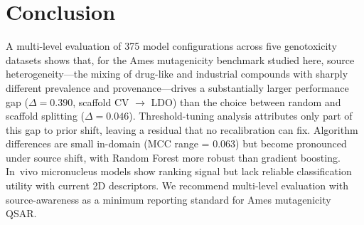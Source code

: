 \section{Conclusion}

A multi-level evaluation of 375 model configurations across five genotoxicity datasets shows that, for the Ames mutagenicity benchmark studied here, source heterogeneity---the mixing of drug-like and industrial compounds with sharply different prevalence and provenance---drives a substantially larger performance gap ($\Delta = 0.390$, scaffold CV $\to$ LDO) than the choice between random and scaffold splitting ($\Delta = 0.046$). Threshold-tuning analysis attributes only part of this gap to prior shift, leaving a residual that no recalibration can fix. Algorithm differences are small in-domain (MCC range = 0.063) but become pronounced under source shift, with Random Forest more robust than gradient boosting. In~vivo micronucleus models show ranking signal but lack reliable classification utility with current 2D descriptors. We recommend multi-level evaluation with source-awareness as a minimum reporting standard for Ames mutagenicity QSAR.
